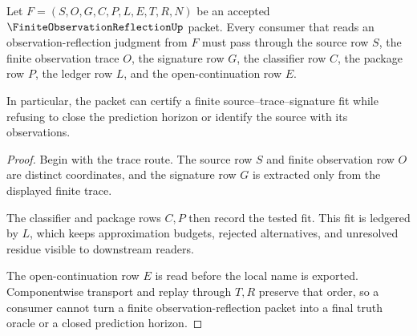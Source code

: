 \begin{theorem}
\label{thm:finite-observation-reflection-open-horizon}
Let $F=(S,O,G,C,P,L,E,T,R,N)$ be an accepted $\FiniteObservationReflectionUp$ packet. Every consumer that reads an observation-reflection judgment from $F$ must pass through the source row $S$, the finite observation trace $O$, the signature row $G$, the classifier row $C$, the package row $P$, the ledger row $L$, and the open-continuation row $E$.

In particular, the packet can certify a finite source--trace--signature fit while refusing to close the prediction horizon or identify the source with its observations.
\end{theorem}
\begin{proof}
Begin with the trace route. The source row $S$ and finite observation row $O$ are distinct coordinates, and the signature row $G$ is extracted only from the displayed finite trace.

The classifier and package rows $C,P$ then record the tested fit. This fit is ledgered by $L$, which keeps approximation budgets, rejected alternatives, and unresolved residue visible to downstream readers.

The open-continuation row $E$ is read before the local name is exported. Componentwise transport and replay through $T,R$ preserve that order, so a consumer cannot turn a finite observation-reflection packet into a final truth oracle or a closed prediction horizon.
\end{proof}




